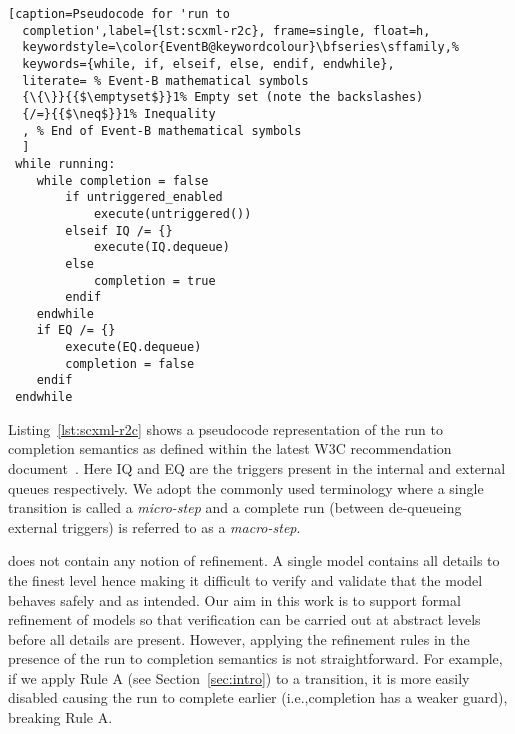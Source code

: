 \begin{lstlisting}[caption=Pseudocode for 'run to
  completion',label={lst:scxml-r2c}, frame=single, float=h,
  keywordstyle=\color{EventB@keywordcolour}\bfseries\sffamily,%
  keywords={while, if, elseif, else, endif, endwhile},
  literate= % Event-B mathematical symbols
  {\{\}}{{$\emptyset$}}1% Empty set (note the backslashes)
  {/=}{{$\neq$}}1% Inequality
  , % End of Event-B mathematical symbols
  ]
 while running:
 	while completion = false
 		if untriggered_enabled
 			execute(untriggered())
 		elseif IQ /= {}
 			execute(IQ.dequeue)
 		else
 			completion = true
 		endif
 	endwhile
 	if EQ /= {}
 		execute(EQ.dequeue) 
 		completion = false
 	endif
 endwhile 
\end{lstlisting}

Listing~\ref{lst:scxml-r2c} shows a pseudocode representation of the run to completion semantics as defined within the latest W3C recommendation document~\cite{scxmlwebsite}. Here IQ and EQ are the triggers present in the internal and external queues respectively. We adopt the commonly used terminology where a single transition is called a \emph{micro-step} and a complete run (between de-queueing external triggers) is referred to as a \emph{macro-step}.

\SCXML does not contain any notion of refinement. 
A single model contains all details to the finest level hence making it difficult to verify and validate that the model behaves safely and as intended.
Our aim in this work is to support formal refinement of \SCXML models so that verification can be carried out at abstract levels before all details are present.
However, applying the refinement rules in the presence of the run to completion semantics is not straightforward.
For example, if we apply Rule A (see Section~\ref{sec:intro}) to a transition, it is more easily disabled causing the run to complete earlier (i.e.,completion has a weaker guard), breaking Rule A.


